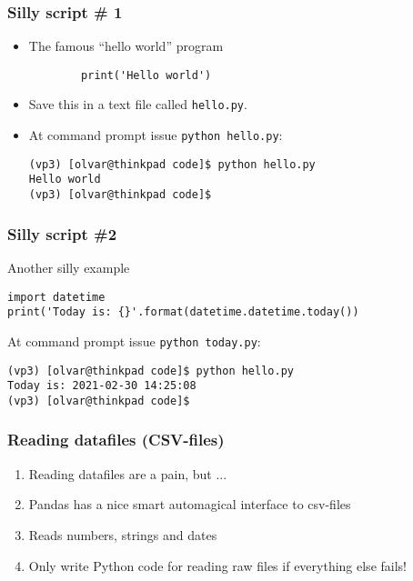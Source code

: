 \documentclass[aspectratio=169,t]{beamer}
\begin{document}
\begin{frame}[fragile]
  \frametitle{Silly script \# 1}

  \begin{itemize}
   \item The famous ``hello world'' program
     \begin{verbatim}
        print('Hello world')
     \end{verbatim}
   \item Save this in a text file called \texttt{hello.py}.
   \item At command prompt issue \texttt{python hello.py}:
     \begin{verbatim}
(vp3) [olvar@thinkpad code]$ python hello.py
Hello world
(vp3) [olvar@thinkpad code]$
     \end{verbatim}
  \end{itemize}

\end{frame}


\begin{frame}[fragile]
  \frametitle{Silly script \#2}

  Another silly example
  \begin{verbatim}
import datetime
print('Today is: {}'.format(datetime.datetime.today())
  \end{verbatim}

  At command prompt issue \texttt{python today.py}:
     \begin{verbatim}
(vp3) [olvar@thinkpad code]$ python hello.py
Today is: 2021-02-30 14:25:08
(vp3) [olvar@thinkpad code]$
     \end{verbatim}

\end{frame}

\begin{frame}[fragile]
  \frametitle{Reading datafiles (CSV-files)}

  \begin{enumerate}
   \item Reading datafiles are a pain, but ...
   \item Pandas has a nice smart automagical interface to csv-files
   \item Reads numbers, strings and dates
   \item Only write Python code for reading raw files if everything else fails!
  \end{enumerate}

\end{frame}
\end{document}
